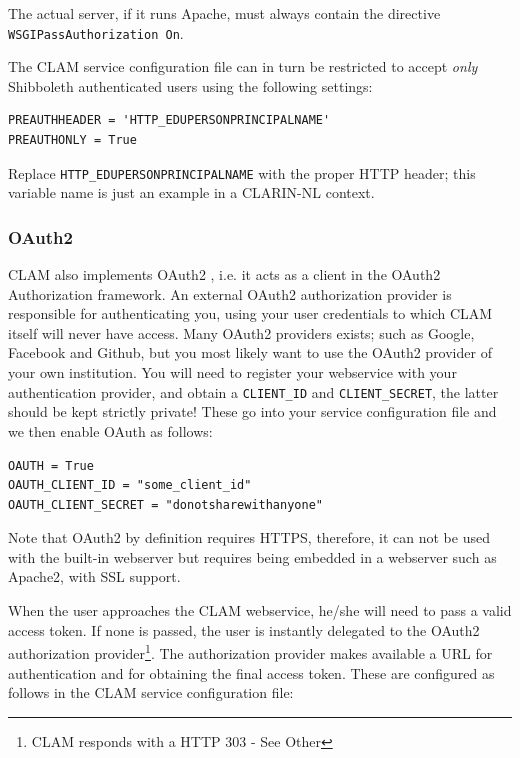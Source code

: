 \documentclass[a4paper,12pt,twoside,openright]{report}
\begin{document}
The actual server, if it runs Apache, must always contain the directive \\
\texttt{WSGIPassAuthorization On}.

The CLAM service configuration file can in turn be restricted to accept \emph{only}
Shibboleth authenticated users using the following settings:

{ \small
\begin{verbatim}
PREAUTHHEADER = 'HTTP_EDUPERSONPRINCIPALNAME'
PREAUTHONLY = True
\end{verbatim}
}

Replace \texttt{HTTP\_EDUPERSONPRINCIPALNAME} with the proper HTTP header; this
variable name is just an example in a CLARIN-NL context.

\subsubsection{OAuth2}

CLAM also implements OAuth2 \cite{OAUTH2}, i.e. it acts as a client in the
OAuth2 Authorization framework. An external OAuth2 authorization provider is
responsible for authenticating you, using your user credentials to which CLAM
itself will never have access. Many OAuth2 providers exists; such as Google,
Facebook and Github, but you most likely want to use the OAuth2 provider of
your own institution. You will need to register your webservice with your
authentication provider, and obtain a \texttt{CLIENT\_ID} and
\texttt{CLIENT\_SECRET}, the latter should be kept strictly private! These go
into your service configuration file and we then enable OAuth as follows: 

{ \small
\begin{verbatim}
OAUTH = True
OAUTH_CLIENT_ID = "some_client_id"
OAUTH_CLIENT_SECRET = "donotsharewithanyone"
\end{verbatim}
}

Note that OAuth2 by definition requires HTTPS, therefore, it can not be used
with the built-in webserver but requires being embedded in a webserver such as
Apache2, with SSL support.

When the user approaches the CLAM webservice, he/she will need to pass a valid
access token. If none is passed, the user is instantly delegated to the OAuth2
authorization provider\footnote{CLAM responds with a HTTP 303 - See Other}.
The authorization provider makes available a URL for authentication and for
obtaining the final access token. These are configured as follows in the CLAM
service configuration file: 
\end{document}
